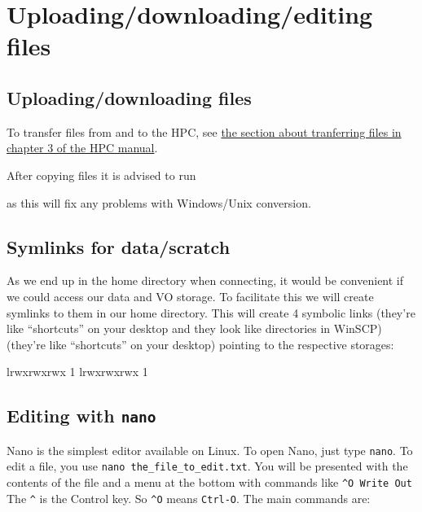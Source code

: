 \chapter{Uploading/downloading/editing files}

\section{Uploading/downloading files}
\label{sec:uploading-files}

To transfer files from and to the HPC, see
\href{\HPCManualURL#sec:filetranfer}{the section about tranferring files in chapter 3 of the HPC manual}.

\ifwindows

After copying files it is advised to run
\hypertarget{sec:dos2unix}{}

\begin{prompt}
\end{prompt}

as this will fix any problems with Windows/Unix conversion.
\fi
\section{Symlinks for data/scratch}

As we end up in the home directory when connecting, it would be convenient if we
could access our data and VO storage. To facilitate this we will create
symlinks to them in our home directory. This will create 4 symbolic links
\ifwindows
(they're like ``shortcuts'' on your desktop and they look like directories in WinSCP)
\else
(they're like ``shortcuts'' on your desktop)
\fi
pointing to the respective storages:

\begin{prompt}
lrwxrwxrwx 1 %
lrwxrwxrwx 1 %
\end{prompt}

\section{Editing with \texttt{nano}}

Nano is the simplest editor available on Linux. To open Nano, just type
\verb|nano|. To edit a file, you use \verb|nano the_file_to_edit.txt|. You will
be presented with the contents of the file and a menu at the bottom with
commands like \verb|^O Write Out| The \verb|^| is the Control key. So \verb|^O| means
\verb|Ctrl-O|. The main commands are:

